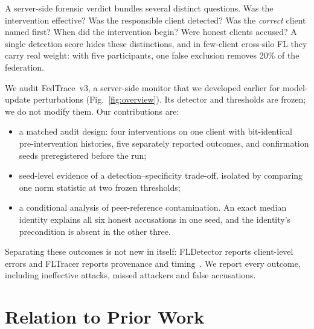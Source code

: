 \documentclass{article}
\newcommand{\vthree}{FedTrace~v3}
\begin{document}
A server-side forensic verdict bundles several distinct questions. Was the intervention effective? Was the
responsible client detected? Was the \emph{correct} client named first? When did the intervention begin? Were honest
clients accused? A single detection score hides these distinctions, and in few-client cross-silo FL they carry
real weight: with five participants, one false exclusion removes 20\% of the federation.

We audit \vthree, a server-side monitor that we developed earlier for model-update perturbations
(Fig.~\ref{fig:overview}). Its detector and thresholds are frozen; we do not modify them. Our contributions are:
\begin{itemize}
  \item a matched audit design: four interventions on one client with bit-identical pre-intervention histories,
        five separately reported outcomes, and confirmation seeds preregistered before the run;
  \item seed-level evidence of a detection--specificity trade-off, isolated by comparing one norm statistic at two
        frozen thresholds;
  \item a conditional analysis of peer-reference contamination. An exact median identity explains all six honest
        accusations in one seed, and the identity's precondition is absent in the other three.
\end{itemize}
Separating these outcomes is not new in itself: FLDetector reports client-level errors and FLTracer reports
provenance and timing~\cite{zhang2022fldetector,zhang2024fltracer}. We report every outcome, including
ineffective attacks, missed attackers and false accusations.

\section{Relation to Prior Work}
\label{sec:prior}
\end{document}
